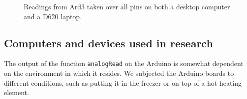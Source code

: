\documentclass[a4paper]{article}           %
\begin{document}
  \begin{figure}[h!]
    \centering  

    \caption{Readings from Ard3 taken over all pins on both a desktop computer and a D620 laptop.}
    \label{fig:allpins}
        
  \end{figure}


\subsection{Computers and devices used in research}

The output of the function \texttt{analogRead} on the Arduino is somewhat dependent on the environment in which it resides. We subjected the Arduino boards to different conditions, such as putting it in the freezer or on top of a hot heating element. 
\end{document}
